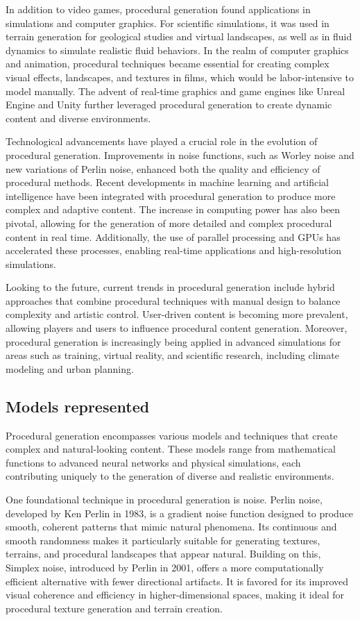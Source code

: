 In addition to video games, procedural generation found applications in simulations and computer graphics. For scientific simulations, it was used in terrain generation for geological studies and virtual landscapes, as well as in fluid dynamics to simulate realistic fluid behaviors. In the realm of computer graphics and animation, procedural techniques became essential for creating complex visual effects, landscapes, and textures in films, which would be labor-intensive to model manually. The advent of real-time graphics and game engines like Unreal Engine and Unity further leveraged procedural generation to create dynamic content and diverse environments.

Technological advancements have played a crucial role in the evolution of procedural generation. Improvements in noise functions, such as Worley noise and new variations of Perlin noise, enhanced both the quality and efficiency of procedural methods. Recent developments in machine learning and artificial intelligence have been integrated with procedural generation to produce more complex and adaptive content. The increase in computing power has also been pivotal, allowing for the generation of more detailed and complex procedural content in real time. Additionally, the use of parallel processing and GPUs has accelerated these processes, enabling real-time applications and high-resolution simulations.

Looking to the future, current trends in procedural generation include hybrid approaches that combine procedural techniques with manual design to balance complexity and artistic control. User-driven content is becoming more prevalent, allowing players and users to influence procedural content generation. Moreover, procedural generation is increasingly being applied in advanced simulations for areas such as training, virtual reality, and scientific research, including climate modeling and urban planning.

\subsection{Models represented}
Procedural generation encompasses various models and techniques that create complex and natural-looking content. These models range from mathematical functions to advanced neural networks and physical simulations, each contributing uniquely to the generation of diverse and realistic environments.

One foundational technique in procedural generation is noise. Perlin noise, developed by Ken Perlin in 1983, is a gradient noise function designed to produce smooth, coherent patterns that mimic natural phenomena. Its continuous and smooth randomness makes it particularly suitable for generating textures, terrains, and procedural landscapes that appear natural. Building on this, Simplex noise, introduced by Perlin in 2001, offers a more computationally efficient alternative with fewer directional artifacts. It is favored for its improved visual coherence and efficiency in higher-dimensional spaces, making it ideal for procedural texture generation and terrain creation.

